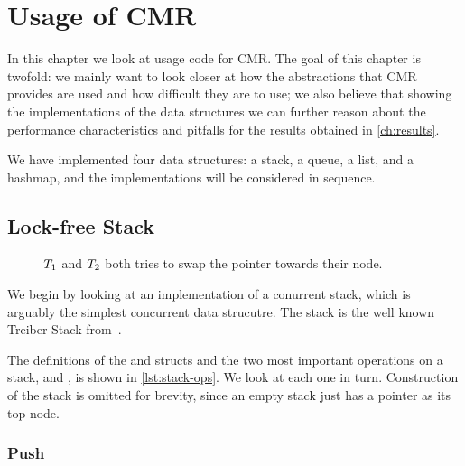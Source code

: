 \chapter{Usage of CMR\label{ch:usage}}

In this chapter we look at usage code for CMR\@. The goal of this chapter is twofold: we mainly
want to look closer at how the abstractions that CMR provides are used and how difficult they are
to use; we also believe that showing the implementations of the data structures we can further
reason about the performance characteristics and pitfalls for the results obtained in
\cref{ch:results}.

We have implemented four data structures: a stack, a queue, a list, and a hashmap, and the
implementations will be considered in sequence.


\clearpage


\section{Lock-free Stack\label{sec:usage-stack}}

\begin{figure}[b]
\centering

\caption{$T\sb{1}$ and $T\sb{2}$ both tries to swap the  pointer towards their
node.}
\end{figure}

We begin by looking at an implementation of a conurrent stack, which is arguably the simplest
concurrent data strucutre. The stack is the well known Treiber Stack
from~\cite{treiber1986systems}.

The definitions of the  and  structs and the two most important operations
on a stack,  and , is shown in \cref{lst:stack-ops}. We look at each one in
turn. Construction of the stack is omitted for brevity, since an empty stack just has a 
pointer as its top node.

\begin{figure}[ht]

\end{figure}

\subsection{Push}

